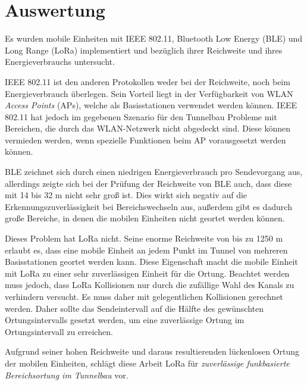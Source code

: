 \section{Auswertung}
Es wurden mobile Einheiten mit IEEE 802.11, Bluetooth Low Energy (BLE) und Long Range (LoRa) implementiert und bezüglich ihrer Reichweite und ihres Energieverbrauchs untersucht.

IEEE 802.11 ist den anderen Protokollen weder bei der Reichweite, noch beim Energieverbrauch überlegen. 
Sein Vorteil liegt in der Verfügbarkeit von WLAN \emph{Access Points} (APs), welche als Basisstationen verwendet werden können.
IEEE 802.11 hat jedoch im gegebenen Szenario für den Tunnelbau Probleme mit Bereichen, die durch das WLAN-Netzwerk nicht abgedeckt sind. 
Diese können vermieden werden, wenn spezielle Funktionen beim AP vorausgesetzt werden können.

BLE zeichnet sich durch einen niedrigen Energieverbrauch pro Sendevorgang aus, allerdings zeigte sich bei der Prüfung der Reichweite von BLE auch, dass diese mit 14 bis 32 m nicht sehr groß ist.
Dies wirkt sich negativ auf die Erkennungszuverlässigkeit bei Bereichswechseln aus, außerdem gibt es dadurch große Bereiche, in denen die mobilen Einheiten nicht geortet werden können.

Dieses Problem hat LoRa nicht. 
Seine enorme Reichweite von bis zu 1250 m erlaubt es, dass eine mobile Einheit an jedem Punkt im Tunnel von mehreren Basisstationen geortet werden kann.
Diese Eigenschaft macht die mobile Einheit mit LoRa zu einer sehr zuverlässigen Einheit für die Ortung.
Beachtet werden muss jedoch, dass LoRa Kollisionen nur durch die zufällige Wahl des Kanals zu verhindern versucht.
Es muss daher mit gelegentlichen Kollisionen gerechnet werden.
Daher sollte das Sendeintervall auf die Hälfte des gewünschten Ortungsintervalls gesetzt werden, um eine zuverlässige Ortung im Ortungsintervall zu erreichen.

Aufgrund seiner hohen Reichweite und daraus resultierenden lückenlosen Ortung der mobilen Einheiten, schlägt diese Arbeit LoRa für \emph{zuverlässige funkbasierte Bereichsortung im Tunnelbau} vor.





